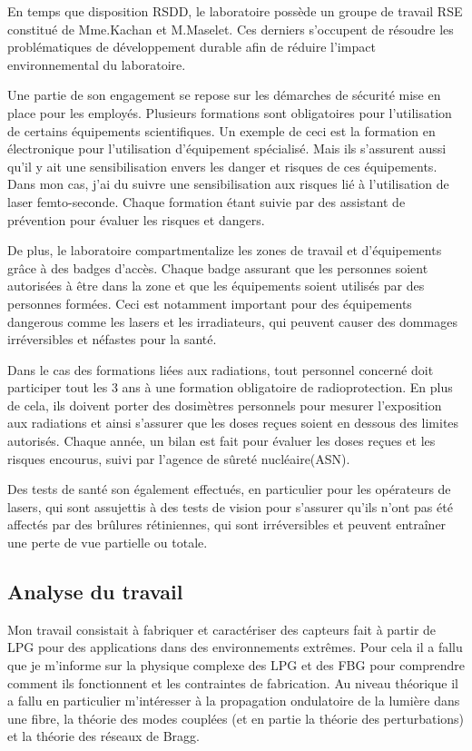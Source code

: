 \documentclass[11pt, openright]{book}
\begin{document}
    En temps que disposition RSDD, le laboratoire possède un groupe de travail RSE constitué de Mme.Kachan et M.Maselet. Ces derniers s'occupent de résoudre les problématiques de dévelop\-pement durable afin de réduire l'impact environnemental du laboratoire.

    Une partie de son engagement se repose sur les démarches de sécurité mise en place pour les employés. Plusieurs formations sont obligatoires pour l'utilisation de certains équipements scientifiques. Un exemple de ceci est la formation en électronique pour l'utilisation d'équipement spécialisé. Mais ils s'assurent aussi qu'il y ait une sensibilisation envers les danger et risques de ces équipements. Dans mon cas, j'ai du suivre une sensibilisation aux risques lié à l'utilisation de laser femto-seconde. Chaque formation étant suivie par des assistant de prévention pour évaluer les risques et dangers.

    De plus, le laboratoire compartmentalize les zones de travail et d'équipements grâce à des badges d'accès. Chaque badge assurant que les personnes soient autorisées à être dans la zone et que les équipements soient utilisés par des personnes formées. Ceci est notamment important pour des équipements dangerous comme les lasers et les irradiateurs, qui peuvent causer des dommages irréversibles et néfastes pour la santé. 

    Dans le cas des formations liées aux radiations, tout personnel concerné doit participer tout les 3 ans à une formation obligatoire de radioprotection. En plus de cela, ils doivent porter des dosimètres personnels pour mesurer l'exposition aux radiations et ainsi s'assurer que les doses reçues soient en dessous des limites autorisés. Chaque année, un bilan est fait pour évaluer les doses reçues et les risques encourus, suivi par l'agence de sûreté nucléaire(ASN).

    Des tests de santé son également effectués, en particulier pour les opérateurs de lasers, qui sont assujettis à des tests de vision pour s'assurer qu'ils n'ont pas été affectés par des brûlures rétiniennes, qui sont irréversibles et peuvent entraîner une perte de vue partielle ou totale.
    
    
    \subsection{Analyse du travail}

    Mon travail consistait à fabriquer et caractériser des capteurs fait à partir de LPG pour des applications dans des environnements extrêmes. Pour cela il a fallu que je m'informe sur la physique complexe des LPG et des FBG pour comprendre comment ils fonctionnent et les contraintes  de fabrication. Au niveau théorique il a fallu en particulier m'intéresser à la propagation ondulatoire de la lumière dans une fibre, la théorie des modes couplées (et en partie la théorie des perturbations) et la théorie des réseaux de Bragg.
\end{document}
